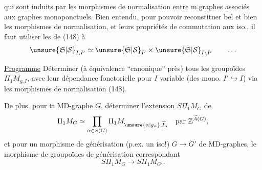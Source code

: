 qui sont induits par les morphismes de normalisation entre m.graphes associés aux graphes monoponctuels. Bien entendu, pour pouvoir reconstituer bel et bien les  morphismes de normalisation, et leurs propriétés de commutation aux iso., il faut utiliser les   de (148) à
\[
\unsure{\mathfrak S|\mathcal S}_{I,I'}\simeq\unsure{\mathfrak S|\mathcal S}_{I'}\times\unsure{\mathfrak S|\mathcal S}_{I\setminus I'}\qquad\ldots
\]

\uline{Programme} Déterminer (à équivalence ``canonique'' près) tous les groupoïdes $\Pi_1M_{g,I}$, avec leur dépendance fonctorielle pour  $I$ variable (des mono. $I'\hookrightarrow I$) via les morphismes de normalisation (148).

De plus, pour tt MD-graphe $G$, déterminer l'extension $S\Pi_1M_G$ de
\[
\Pi_1M_G\simeq\prod_{\alpha\in S(G)}\Pi_1M_{\unsure{\alpha|g_\alpha},\widehat I_\alpha}\quad\text{par }\mathbb Z^{\widetilde A(G)},
\]
et pour un morphisme de générisation (p.ex. un iso!)  $G\longrightarrow G'$ de MD-graphes,  le morphisme de groupoïdes de générisation correspondant
\[
S\Pi_1M_G\longrightarrow S\Pi_1M_{G'}.
\]
